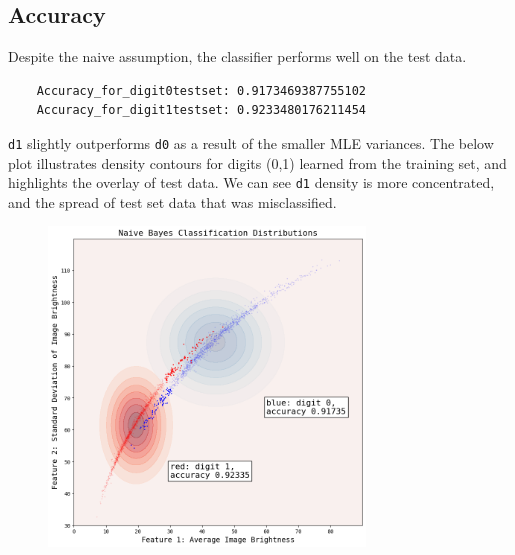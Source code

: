 \documentclass{article}
\begin{document}
\subsection*{Accuracy}
Despite the naive assumption, the classifier performs well on the test data.

\begin{center}
\begin{tcolorbox}[width=0.9\textwidth]
\begin{verbatim}
    Accuracy_for_digit0testset: 0.9173469387755102
    Accuracy_for_digit1testset: 0.9233480176211454
\end{verbatim}
\end{tcolorbox}
\end{center}

\texttt{d1} slightly outperforms \texttt{d0} as a result of the smaller MLE variances. The below plot illustrates density contours for digits (0,1) learned from the training set, and highlights the overlay of test data. We can see \texttt{d1} density is more concentrated, and the spread of test set data that was misclassified.

\begin{figure}[h]
\centering
\includegraphics[width=0.75\textwidth]{output.png}
\end{figure}
\end{document}
